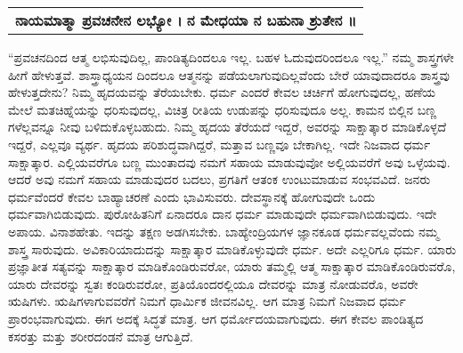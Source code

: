 \begin{longtable}{@{\hspace{-15pt}}l@{}}
\textbf{ನಾಯಮಾತ್ಮಾ ಪ್ರವಚನೇನ ಲಭ್ಯೋ ।} \textbf{ನ ಮೇಧಯಾ ನ ಬಹುನಾ ಶ್ರುತೇನ ॥} \\
\end{longtable}

“ಪ್ರವಚನದಿಂದ ಆತ್ಮ ಲಭಿಸುವುದಿಲ್ಲ, ಪಾಂಡಿತ್ಯದಿಂದಲೂ ಇಲ್ಲ. ಬಹಳ ಓದುವುದರಿಂದಲೂ ಇಲ್ಲ.” ನಮ್ಮ ಶಾಸ್ತ್ರಗಳೇ ಹೀಗೆ ಹೇಳುತ್ತವೆ. ಶಾಸ್ತ್ರಾಧ್ಯಯನ ದಿಂದಲೂ ಆತ್ಮನನ್ನು ಪಡೆಯಲಾಗುವುದಿಲ್ಲವೆಂದು ಬೇರೆ ಯಾವುದಾದರೂ ಶಾಸ್ತ್ರವು ಹೇಳುತ್ತದೇನು? ನಿಮ್ಮ ಹೃದಯವನ್ನು ತೆರೆಯಬೇಕು. ಧರ್ಮ ಎಂದರೆ ಕೇವಲ ಚರ್ಚಿಗೆ ಹೋಗುವುದಲ್ಲ, ಹಣೆಯ ಮೇಲೆ ಮತಚಿಹ್ನೆಯನ್ನು ಧರಿಸುವುದಲ್ಲ, ವಿಚಿತ್ರ ರೀತಿಯ ಉಡುಪನ್ನು ಧರಿಸುವುದೂ ಅಲ್ಲ. ಕಾಮನ ಬಿಲ್ಲಿನ ಬಣ್ಣ ಗಳೆಲ್ಲವನ್ನೂ ನೀವು ಬಳಿದುಕೊಳ್ಳಬಹುದು. ನಿಮ್ಮ ಹೃದಯ ತೆರೆಯದೆ ಇದ್ದರೆ, ಅವರನ್ನು ಸಾಕ್ಷಾತ್ಕಾರ ಮಾಡಿಕೊಳ್ಳದೆ ಇದ್ದರೆ, ಎಲ್ಲವೂ ವ್ಯರ್ಥ. ಹೃದಯ ಪರಿಶುದ್ಧವಾಗಿದ್ದರೆ, ಮತ್ತಾವ ಬಣ್ಣವೂ ಬೇಕಾಗಿಲ್ಲ. ಇದೇ ನಿಜವಾದ ಧರ್ಮ ಸಾಕ್ಷಾತ್ಕಾರ. ಎಲ್ಲಿಯವರೆಗೂ ಬಣ್ಣ ಮುಂತಾದವು ನಮಗೆ ಸಹಾಯ ಮಾಡುವುವೋ ಅಲ್ಲಿಯವರೆಗೆ ಅವು ಒಳ್ಳೆಯವು. ಆದರೆ ಅವು ನಮಗೆ ಸಹಾಯ ಮಾಡುವುದರ ಬದಲು, ಪ್ರಗತಿಗೆ ಆತಂಕ ಉಂಟುಮಾಡುವ ಸಂಭವವಿದೆ. ಜನರು ಧರ್ಮವೆಂದರೆ ಕೇವಲ ಬಾಹ್ಯಾಚರಣೆ ಎಂದು ಭಾವಿಸುವರು. ದೇವಸ್ಥಾನಕ್ಕೆ ಹೋಗುವುದೇ ಒಂದು ಧರ್ಮವಾಗಿಬಿಡುವುದು. ಪುರೋಹಿತನಿಗೆ ಏನಾದರೂ ದಾನ ಧರ್ಮ ಮಾಡುವುದೇ ಧರ್ಮವಾಗಿಬಿಡುವುದು. ಇದೇ ಅಪಾಯ. ವಿನಾಶಹೇತು. ಇದನ್ನು ತಕ್ಷಣ ಅಡಗಿಸಬೇಕು. ಬಾಹ್ಯೇಂದ್ರಿಯಗಳ ಜ್ಞಾನಕೂಡ ಧರ್ಮವಲ್ಲವೆಂದು ನಮ್ಮ ಶಾಸ್ತ್ರ ಸಾರುವುದು. ಅವಿಕಾರಿಯಾದುದನ್ನು ಸಾಕ್ಷಾತ್ಕಾರ ಮಾಡಿಕೊಳ್ಳುವುದೇ ಧರ್ಮ. ಅದೇ ಎಲ್ಲರಿಗೂ ಧರ್ಮ. ಯಾರು ಪ್ರಜ್ಞಾತೀತ ಸತ್ಯವನ್ನು ಸಾಕ್ಷಾತ್ಕಾರ ಮಾಡಿಕೊಂಡಿರುವರೋ, ಯಾರು ತಮ್ಮಲ್ಲಿ ಆತ್ಮ ಸಾಕ್ಷಾತ್ಕಾರ ಮಾಡಿಕೊಂಡಿರುವರೊ, ಯಾರು ದೇವರನ್ನು ಸ್ವತಃ ಕಂಡಿರುವರೋ, ಪ್ರತಿಯೊಂದರಲ್ಲಿಯೂ ದೇವರನ್ನು ಮಾತ್ರ ನೋಡುವರೊ, ಅವರೇ ಋಷಿಗಳು. ಋಷಿಗಳಾಗುವವರೆಗೆ ನಿಮಗೆ ಧಾರ್ಮಿಕ ಜೀವನವಿಲ್ಲ. ಆಗ ಮಾತ್ರ ನಿಮಗೆ ನಿಜವಾದ ಧರ್ಮ ಪ್ರಾರಂಭವಾಗುವುದು. ಈಗ ಅದಕ್ಕೆ ಸಿದ್ಧತೆ ಮಾತ್ರ. ಆಗ ಧರ್ಮೋದಯವಾಗುವುದು. ಈಗ ಕೇವಲ ಪಾಂಡಿತ್ಯದ ಕಸರತ್ತು ಮತ್ತು ಶರೀರದಂಡನೆ ಮಾತ್ರ ಆಗುತ್ತಿದೆ.

